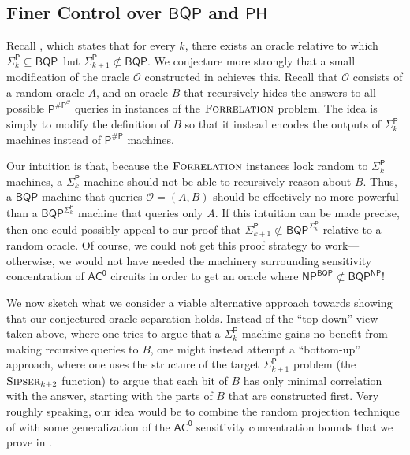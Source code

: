 \documentclass[10pt,a4paper]{article}
\newcommand{\Sipser}{\normalfont\textsc{Sipser}}
\newcommand{\Forrelation}{\normalfont\textsc{Forrelation}}
\begin{document}
\subsection{Finer Control over \texorpdfstring{$\mathsf{BQP}$}{BQP} and \texorpdfstring{$\mathsf{PH}$}{PH}}
Recall , which states that for every $k$, there exists an oracle relative to which $\mathsf{\Sigma}_{k}^{\mathsf{P}}\subseteq\mathsf{BQP}$\ but $\mathsf{\Sigma}_{k+1}^{\mathsf{P}}\not \subset \mathsf{BQP}$. We conjecture more strongly that a small modification of the oracle $\mathcal{O}$ constructed in  achieves this. Recall that $\mathcal{O}$ consists of a random oracle $A$, and an oracle $B$ that recursively hides the answers to all possible $\mathsf{P}^{\mathsf{\# P}^\mathcal{O}}$ queries in instances of the $\Forrelation$ problem. The idea is simply to modify the definition of $B$ so that it instead encodes the outputs of $\mathsf{\Sigma}_{k}^{\mathsf{P}}$ machines instead of $\mathsf{P}^{\mathsf{\# P}}$ machines.

Our intuition is that, because the $\Forrelation$ instances look random to $\mathsf{\Sigma}_{k}^{\mathsf{P}}$ machines, a $\mathsf{\Sigma}_{k}^{\mathsf{P}}$ machine should not be able to recursively reason about $B$. Thus, a $\mathsf{BQP}$ machine that queries $\mathcal{O} = (A, B)$ should be effectively no more powerful than a $\mathsf{BQP}^{\mathsf{\Sigma}_{k}^{\mathsf{P}}}$ machine that queries only $A$. If this intuition can be made precise, then one could possibly appeal to our proof that $\mathsf{\Sigma}_{k+1}^{\mathsf{P}}\not \subset \mathsf{BQP}^{\mathsf{\Sigma}_{k}^\mathsf{P}}$ relative to a random oracle. Of course, we could not get this proof strategy to work---otherwise, we would not have needed the machinery surrounding sensitivity concentration of $\mathsf{AC^0}$ circuits in order to get an oracle where $\mathsf{NP}^\mathsf{BQP} \not\subset \mathsf{BQP}^\mathsf{NP}$!

We now sketch what we consider a viable alternative approach towards showing that our conjectured oracle separation holds. Instead of the ``top-down'' view taken above, where one tries to argue that a $\mathsf{\Sigma}_{k}^{\mathsf{P}}$ machine gains no benefit from making recursive queries to $B$, one might instead attempt a ``bottom-up'' approach, where one uses the structure of the target $\mathsf{\Sigma}_{k+1}^\mathsf{P}$ problem (the $\Sipser_{k+2}$ function) to argue that each bit of $B$ has only minimal correlation with the answer, starting with the parts of $B$ that are constructed first. Very roughly speaking, our idea would be to combine the random projection technique of \cite{HRST17} with some generalization of the $\mathsf{AC^0}$ sensitivity concentration bounds that we prove in .
\end{document}
